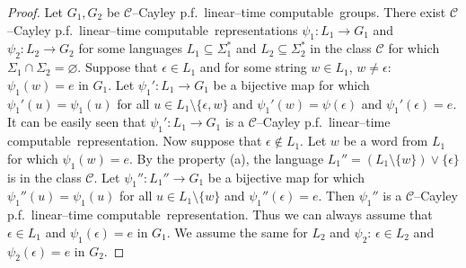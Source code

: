 \documentclass[article,12pt]{elsarticle}
\newcommand\ClinearC{$\mathcal{C}$--Cayley p.f.~linear--time computable}
\begin{document}
\begin{proof}       
	Let $G_1,G_2$ be  
	\ClinearC\ groups. 
	There exist \ClinearC\ representations 
	$\psi_1: L_1 \rightarrow G_1$ and 
	$\psi_2: L_2 \rightarrow G_2$ for some languages 
	$L_1 \subseteq \Sigma_1 ^*$ and 
	$L_2 \subseteq \Sigma_2 ^*$ in the class 
	$\mathcal{C}$ for which 
	$\Sigma_1 \cap \Sigma_2 = \varnothing$.   
	Suppose that $\epsilon \in L_1$ and
	for some string $w \in L_1$, 
	$w \not= \epsilon$:  $\psi_1 (w) =e$ in $G_1$. 
	Let $\psi_1' : L_1 \rightarrow G_1$ be a bijective 
	map for which $\psi_1' (u)=\psi_1 (u)$ for all  
	$u \in L_1 \setminus \{\epsilon,w\}$ and 
	$\psi_1'(w)=\psi(\epsilon)$ and 
	$\psi_1'(\epsilon)=e$. It can be easily seen that  
	$\psi_1': L_1 \rightarrow G_1$ is a  
	\ClinearC\ representation. 
	Now suppose that $\epsilon \not\in L_1$. Let 
	$w $ be a word from $L_1$ for which $\psi_1(w)=e$. 
	By the property (a), the language 
	$L_1'' = (L_1 \setminus \{w\}) \vee \{\epsilon\}$ 
	is in the class $\mathcal{C}$. 
	Let $\psi_1 '' : L_1'' \rightarrow G_1$ 
	be a bijective map for which 
	$\psi_1 '' (u) = \psi_1(u)$ for all 
	$u \in L_1 \setminus  \{w\}$ and 
	$\psi_1 ''(\epsilon) = e$. Then 
	$\psi_1 ''$ is a \ClinearC\ representation.
	Thus we can always assume that 
	$\epsilon \in L_1$ and $\psi_1(\epsilon)=e$  
	in $G_1$. We assume the same for $L_2$ and $\psi_2$:  
	$\epsilon \in L_2$ and $\psi_2(\epsilon)=e$ in $G_2$. 
	

\end{proof}
\end{document}
